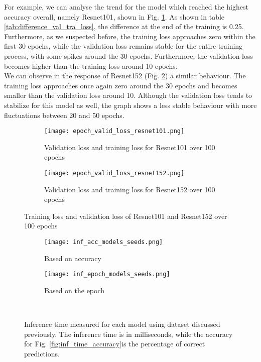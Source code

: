 For example, we can analyse the trend for the model which reached the highest accuracy overall, namely Resnet101, shown in Fig. \ref{fig:epoch_valid_loss_resnet101}. As shown in table \ref{tab:difference_val_tra_loss}, the difference at the end of the training is 0.25. Furthermore, as we suspected before, the training loss approaches zero within the first 30 epochs, while the validation loss remains stable for the entire training process, with some spikes around the 30 epochs. Furthermore, the validation loss becomes higher than the training loss around 10 epochs.\\
We can observe in the response of Resnet152 (Fig. \ref{fig:epoch_valid_loss_resnet152}) a similar behaviour. The training loss approaches once again zero around the 30 epochs and becomes smaller than the validation loss around 10. Although the validation loss tends to stabilize for this model as well, the graph shows a less stable behaviour with more fluctuations between 20 and 50 epochs. \\
\begin{figure}[h]
\begin{subfigure}{0.5\textwidth}
     \centering
	    \texttt{[image: epoch\_valid\_loss\_resnet101.png]}
\caption{Validation loss and training loss for Resnet101 over 100 epochs}\label{fig:epoch_valid_loss_resnet101}
     \end{subfigure}
\begin{subfigure}{0.5\textwidth}
     \centering
	    \texttt{[image: epoch\_valid\_loss\_resnet152.png]}
\caption{Validation loss and training loss for Resnet152 over 100 epochs}\label{fig:epoch_valid_loss_resnet152}
     \end{subfigure}  
     \caption{Training loss and validation loss of Resnet101 and Resnet152 over 100 epochs}
        \label{fig:tran_valid_loss_seeds_res_100}
\end{figure}


\begin{figure}[h]
     \begin{subfigure}{0.5\textwidth}
	    \texttt{[image: inf\_acc\_models\_seeds.png]}
	    \caption{Based on accuracy}
         \label{fig:inf_acc_models_seeds}
     \end{subfigure}
     \hfill
     \begin{subfigure}{0.5\textwidth}
	    \texttt{[image: inf\_epoch\_models\_seeds.png]}
	    \caption{Based on the epoch}
        \label{fig:inf_epoch_models_seeds}
     \end{subfigure}\\
     \caption[Inference time measured for each model]{Inference time measured for each model using dataset discussed previously. The inference time is in milliseconds, while the accuracy for Fig. \ref{fig:inf_time_accuracy}is the percentage of correct predictions.}
        \label{fig:inf_time_epoch_seeds}
\end{figure}
